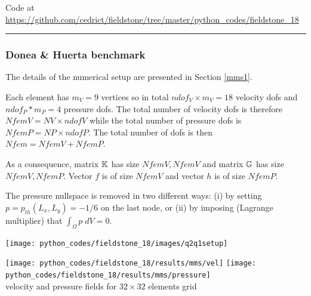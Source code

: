 

\begin{center}
Code at \url{https://github.com/cedrict/fieldstone/tree/master/python_codes/fieldstone_18}
\end{center}

\par\noindent\rule{\textwidth}{0.4pt}

\subsubsection*{Donea \& Huerta benchmark}
The details of the numerical setup are presented in Section \ref{mms1}.

Each element has $m_V=9$ vertices so in total $ndof_V\times m_V=18$ velocity dofs and 
$ndof_P*m_P=4$ pressure dofs. The total number of 
velocity dofs is therefore $NfemV=NV \times ndofV$ while the total number of
pressure dofs is $NfemP=NP\times ndofP$. The total number of dofs is then $Nfem=NfemV+NfemP$.

As a consequence, matrix ${\mathbb{K}}$ has size $NfemV,NfemV$ and matrix ${\mathbb{G}}$ has size $NfemV,NfemP$.
Vector $f$ is of size $NfemV$ and vector $h$ is of size $NfemP$.  

The pressure nullspace is removed in two different ways:
(i) by setting $p=p_{th}(L_x,L_y)=-1/6$ on the last node, or (ii)
by imposing (Lagrange multiplier) that $\int_\Omega p \; dV=0$.

\begin{center}
\texttt{[image: python\_codes/fieldstone\_18/images/q2q1setup]}
\end{center}

\begin{center}
\texttt{[image: python\_codes/fieldstone\_18/results/mms/vel]}
\texttt{[image: python\_codes/fieldstone\_18/results/mms/pressure]}\\
{\captionfont velocity and pressure fields for $32\times 32$ elements grid}
\end{center}

